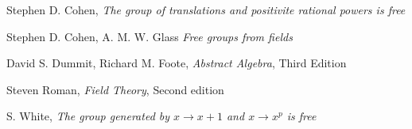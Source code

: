 \begin{thebibliography}{99}

  Stephen D. Cohen,
  \textit{The group of translations and positivite rational powers is free}

  Stephen D. Cohen, A. M. W. Glass
  \textit{Free groups from fields}

  David S. Dummit,
  Richard M. Foote,
  \textit{Abstract Algebra},
  Third Edition

  Steven Roman,
  \textit{Field Theory},
  Second edition

  S. White,
  \textit{The group generated by $x \rightarrow x + 1$ and $x \rightarrow x^p$
  is free}
\end{thebibliography}
